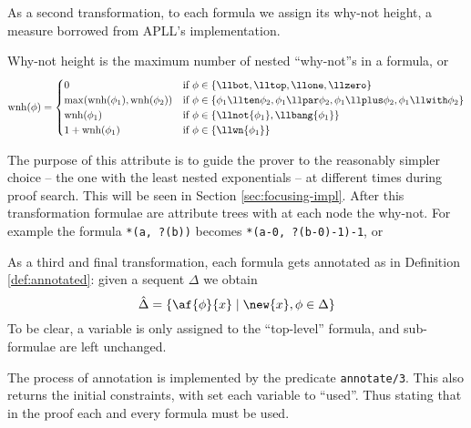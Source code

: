 As a second transformation, to each formula we assign its why-not height, a measure borrowed from APLL's implementation.
\begin{define}
	\label{def:why-not-height}
	Why-not height is the maximum number of nested ``why-not''s in a formula, or
	$$ \mathrm{wnh}(\phi) = 
	\begin{cases}	
		0 & \text{if }\phi \in \{\llbot, \lltop, \llone, \llzero\} \\
		\max(\mathrm{wnh}(\phi_1), \mathrm{wnh}(\phi_2)) & \text{if } \phi \in \{ \phi_1 \llten \phi_2, \phi_1 \llpar \phi_2, \phi_1 \llplus \phi_2, \phi_1 \llwith \phi_2 \} \\
		\mathrm{wnh}(\phi_1) & \text{if }\phi \in \{ \llnot{\phi_1}, \llbang{\phi_1}\} \\
		1 + \mathrm{wnh}(\phi_1) & \text{if }\phi \in \{ \llwn{\phi_1} \} 
	\end{cases}
	$$
\end{define}
The purpose of this attribute is to guide the prover to the reasonably simpler choice -- the one with the least nested exponentials -- at different times during proof search.
This will be seen in Section \ref{sec:focusing-impl}.
After this transformation formulae are attribute trees with at each node the why-not.
For example the formula \texttt{*(a, ?(b))} becomes \texttt{*(a-0, ?(b-0)-1)-1}, or
\begin{figure}[H]
	\centering
\end{figure}

As a third and final transformation, each formula gets annotated as in Definition \ref{def:annotated}:
given a sequent $\Delta$ we obtain
$$ \hat{\Delta} = \{ \af{\phi}{x} \mid \new{x}, \phi \in \Delta \} $$
To be clear, a variable is only assigned to the ``top-level'' formula, and sub-formulae are left unchanged.

The process of annotation is implemented by the predicate \texttt{annotate/3}.
This also returns the initial constraints, with set each variable to ``used''.
Thus stating that in the proof each and every formula must be used.

